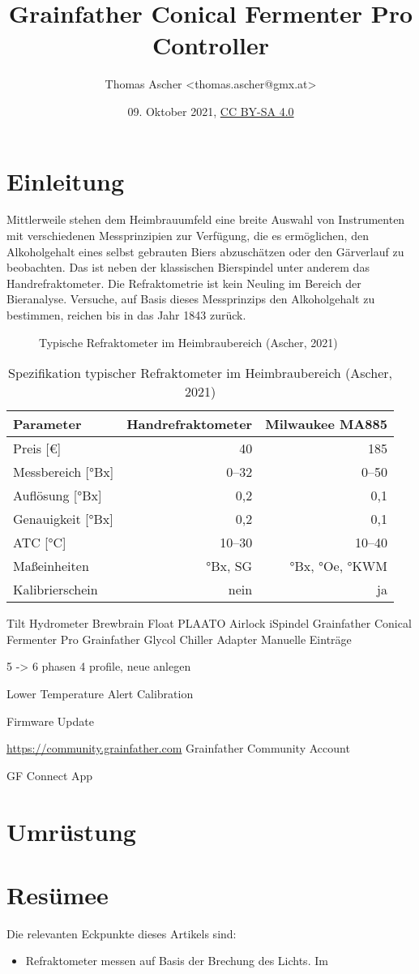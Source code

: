 \documentclass[a4paper,parskip=half]{scrartcl}
\title{Grainfather Conical Fermenter Pro Controller}
\author{Thomas Ascher <thomas.ascher@gmx.at>}
\date{09. Oktober 2021, \href{http://creativecommons.org/licenses/by-sa/4.0/}{CC BY-SA 4.0}}
\begin{document}
\maketitle

\section*{Einleitung}

Mittlerweile stehen dem Heimbrauumfeld eine breite Auswahl von Instrumenten
mit verschiedenen Messprinzipien zur Verfügung, die es ermöglichen, den
Alkoholgehalt eines selbst gebrauten Biers abzuschätzen oder den
Gärverlauf zu beobachten. Das ist neben der klassischen Bierspindel
unter anderem das Handrefraktometer. Die Refraktometrie ist
kein Neuling im Bereich der Bieranalyse. Versuche,
auf Basis dieses Messprinzips den Alkoholgehalt zu bestimmen, reichen bis
in das Jahr 1843 zurück.

\begin{figure}[h]
\centering
\caption{Typische Refraktometer im Heimbraubereich (Ascher, 2021)}
\label{fig:refactotype}
\end{figure}

\begin{table}[h]
\centering
\begin{tabular}{lrr}
\toprule
Parameter &  Handrefraktometer &  Milwaukee MA885 \\
\midrule
Preis [€] & 40 & 185 \\
Messbereich [°Bx] & 0--32 & 0--50 \\
Auflösung [°Bx] & 0,2 & 0,1 \\
Genauigkeit [°Bx] & 0,2 & 0,1 \\
ATC [°C] & 10--30 & 10--40 \\
Maßeinheiten & °Bx, SG & °Bx, °Oe, °KWM \\
Kalibrierschein & nein & ja \\
\bottomrule
\end{tabular}
\caption{Spezifikation typischer Refraktometer im Heimbraubereich  (Ascher, 2021)}
\label{table:refactospec}
\end{table}

Tilt Hydrometer
Brewbrain Float
PLAATO Airlock
iSpindel
Grainfather Conical Fermenter Pro
Grainfather Glycol Chiller Adapter
Manuelle Einträge

5 -> 6 phasen
4 profile, neue anlegen

Lower Temperature Alert
Calibration

Firmware Update

\url{https://community.grainfather.com}
Grainfather Community Account

GF Connect App

\section*{Umrüstung}




\section*{Resümee}

Die relevanten Eckpunkte dieses Artikels sind:

\begin{itemize}
\item Refraktometer messen auf Basis der Brechung des Lichts. Im


\end{itemize}
\end{document}
